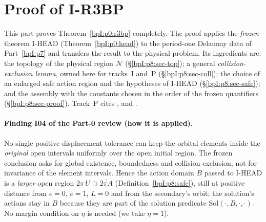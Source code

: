 \section{Proof of I-R3BP}\label{bpI:p8}

This part proves Theorem~\ref{bpI:p0:r3bp} completely. The proof applies the \emph{frozen} theorem I-HEAD
(Theorem~\ref{bpI:p0:head}) to the period-one Delaunay data of Part~\ref{bpI:p7} and transfers the result to the
physical problem. Its ingredients are: the topology of the physical region $\mathcal N$ (\S\ref{bpI:p8:sec-top}); a general
\emph{collision-exclusion lemma}, owned here for tracks~I and~P (\S\ref{bpI:p8:sec-coll}); the choice of an enlarged
safe action region and the hypotheses of I-HEAD (\S\ref{bpI:p8:sec-safe}); and the assembly with the constants chosen in the
order of the frozen quantifiers (\S\ref{bpI:p8:sec-proof}). Track~P cites , 
and .


\paragraph{Finding I04 of the Part-0 review (how it is applied).} No single positive displacement tolerance can keep the
orbital elements inside the \emph{original} open intervals uniformly over the open initial region. The frozen conclusion asks
for global existence, boundedness and collision exclusion, not for invariance of the element intervals. Hence the action domain
$B$ passed to I-HEAD is a \emph{larger} open region $2\pi\,U\supset\overline{2\pi A}$ (Definition~\ref{bpI:p8:safe}), still at positive
distance from $e=0$, $e=1$, $L=0$ and from the secondary's orbit; the solution's actions stay in $B$ because they are part of the
solution predicate $\mathrm{Sol}(\cdot,B,\cdot,\cdot)$. No margin condition on $\eta$ is needed (we take $\eta=1$).

